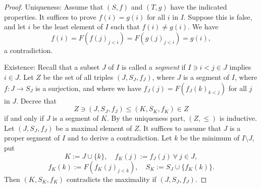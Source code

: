 \documentclass[12pt]{article}
\theoremstyle{remark}
\theoremstyle{definition}
\begin{document}
\begin{proof}
Uniqueness: Assume that $(S,f)$ and $(T,g)$ have the indicated properties. It suffices to prove $f(i)=g(i)$ for all $i$ in $I$. Suppose this is false, and let $i$ be the least element of $I$ such that $f(i)\neq g(i)$. We have 
$$
f(i)=F(f(j)_{j<i})=F(g(j)_{j<i})=g(i),
$$ 
a contradiction. 

Existence: Recall that a subset $J$ of $I$ is called a {\em segment} if $I\ni i<j\in J$ implies $i\in J$. Let $Z$ be the set of all triples $(J,S_J,f_J)$, where $J$ is a segment of $I$, where $f:J\to S_J$ is a surjection, and where we have $f_J(j)=F(f_J(k)_{k<j})$ for all $j$ in $J$. Decree that 
$$
Z\ni(J,S_J,f_J)\le(K,S_K,f_K)\in Z
$$ 
if and only if $J$ is a segment of $K$. By the uniqueness part, $(Z,\le)$ is inductive. Let $(J,S_J,f_J)$ be a maximal element of $Z$. It suffices to assume that $J$ is a proper segment of $I$ and to derive a contradiction. Let $k$ be the minimum of $I\setminus J$, put 
$$
K:=J\cup\{k\},\quad f_K(j):=f_J(j)\ \forall\ j\in J,
$$
$$
f_K(k):=F(f_K(j)_{j<k}),\quad S_K:=S_J\cup\{f_K(k)\}.
$$ 
Then $(K,S_K,f_K)$ contradicts the maximality if $(J,S_J,f_J)$. 
\end{proof}
\end{document}
